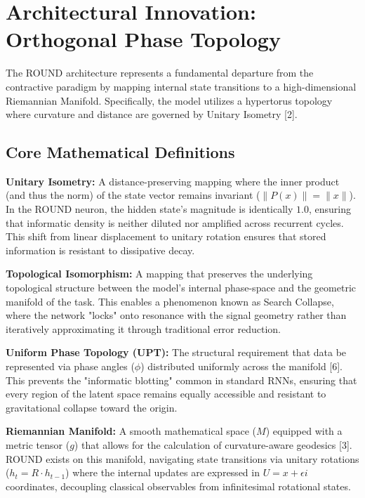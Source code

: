 \documentclass[11pt]{article}
\begin{document}
\section{Architectural Innovation: Orthogonal Phase Topology}

The ROUND architecture represents a fundamental departure from the contractive paradigm by mapping internal state transitions to a high-dimensional Riemannian Manifold. Specifically, the model utilizes a hypertorus topology where curvature and distance are governed by Unitary Isometry [2].

\subsection{Core Mathematical Definitions}

\textbf{Unitary Isometry:} A distance-preserving mapping where the inner product (and thus the norm) of the state vector remains invariant ($\|P(x)\| = \|x\|$). In the ROUND neuron, the hidden state’s magnitude is identically $1.0$, ensuring that informatic density is neither diluted nor amplified across recurrent cycles. This shift from linear displacement to unitary rotation ensures that stored information is resistant to dissipative decay.

\textbf{Topological Isomorphism:} A mapping that preserves the underlying topological structure between the model’s internal phase-space and the geometric manifold of the task. This enables a phenomenon known as Search Collapse, where the network "locks" onto resonance with the signal geometry rather than iteratively approximating it through traditional error reduction.

\textbf{Uniform Phase Topology (UPT):} The structural requirement that data be represented via phase angles ($\phi$) distributed uniformly across the manifold [6]. This prevents the "informatic blotting" common in standard RNNs, ensuring that every region of the latent space remains equally accessible and resistant to gravitational collapse toward the origin.

\textbf{Riemannian Manifold:} A smooth mathematical space ($M$) equipped with a metric tensor ($g$) that allows for the calculation of curvature-aware geodesics [3]. ROUND exists on this manifold, navigating state transitions via unitary rotations ($h_{t} = R \cdot h_{t-1}$) where the internal updates are expressed in $U = x + \epsilon i$ coordinates, decoupling classical observables from infinitesimal rotational states.
\end{document}
